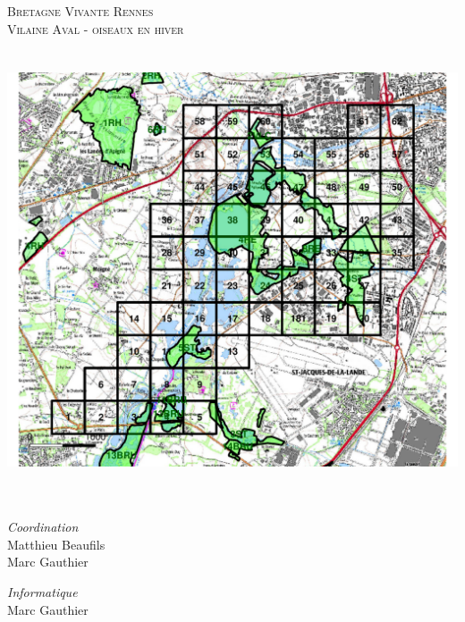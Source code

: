 %
\begin{titlepage}
  \begin{sffamily}
  \begin{center}



    \textsc{\LARGE Bretagne Vivante Rennes}\\[1cm]
    \textsc{\Large Vilaine Aval - oiseaux en hiver}\\[1cm]

    \HRule \\[0.4cm]
    { \huge \bfseries \monsoustitre}
    \HRule \\[0.4cm]
    \includegraphics[width=190mm]{images/territoire_Nord.pdf}~\\[.5cm]
    \HRule \\[0.4cm]
    \begin{minipage}{0.4\textwidth}
      \begin{flushleft} \large
        \emph{Coordination}\\
        Matthieu Beaufils\\
         Marc Gauthier
      \end{flushleft}
    \end{minipage}
    \begin{minipage}{0.4\textwidth}
      \begin{flushright} \large
        \emph{Informatique}\\
        Marc Gauthier
      \end{flushright}
    \end{minipage}

    \vfill
  \end{center}
  \end{sffamily}
\end{titlepage}
